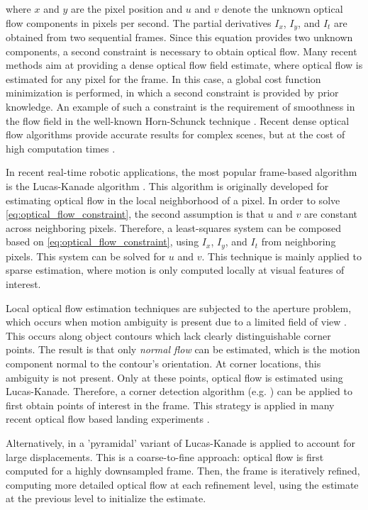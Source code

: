where $x$ and $y$ are the pixel position and $u$ and $v$ denote the unknown optical flow components in pixels per second. The partial derivatives $I_x$, $I_y$, and $I_t$ are obtained from two sequential frames. Since this equation provides two unknown components, a second constraint is necessary to obtain optical flow. Many recent methods aim at providing a dense optical flow field estimate, where optical flow is estimated for any pixel for the frame. In this case, a global cost function minimization is performed, in which a second constraint is provided by prior knowledge. An example of such a constraint is the requirement of smoothness in the flow field in the well-known Horn-Schunck technique \cite{Horn1981}. Recent dense optical flow algorithms provide accurate results for complex scenes, but at the cost of high computation times \cite{Baker2011}.

In recent real-time robotic applications, the most popular frame-based algorithm is the Lucas-Kanade algorithm \cite{Lucas1981}. This algorithm is originally developed for estimating optical flow in the local neighborhood of a pixel. In order to solve \eqref{eq:optical_flow_constraint}, the second assumption is that $u$ and $v$ are constant across neighboring pixels. Therefore, a least-squares system can be composed based on \eqref{eq:optical_flow_constraint}, using $I_x$, $I_y$, and $I_t$ from neighboring pixels. This system can be solved for $u$ and $v$. This technique is mainly applied to sparse estimation, where motion is only computed locally at visual features of interest.

Local optical flow estimation techniques are subjected to the aperture problem, which occurs when motion ambiguity is present due to a limited field of view \cite{Beauchemin1995}. This occurs along object contours which lack clearly distinguishable corner points. The result is that only \emph{normal flow} can be estimated, which is the motion component normal to the contour's orientation. At corner locations, this ambiguity is not present. Only at these points, optical flow is estimated using Lucas-Kanade. Therefore, a corner detection algorithm (e.g. \cite{Rosten2008}) can be applied to first obtain points of interest in the frame. This strategy is applied in many recent optical flow based landing experiments \citet{DeCroon2013, Alkowatly2015, Ho2016, DeCroon2016}.

Alternatively, in \citet{Herisse2012} a 'pyramidal' variant of Lucas-Kanade is applied \cite{Bouguet2000} to account for large displacements. This is a coarse-to-fine approach: optical flow is first computed for a highly downsampled frame. Then, the frame is iteratively refined, computing more detailed optical flow at each refinement level, using the estimate at the previous level to initialize the estimate.

